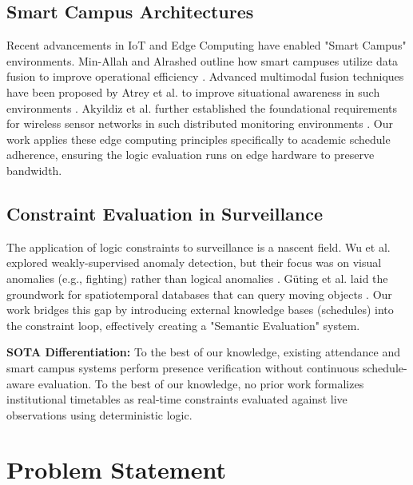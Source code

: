 \documentclass[conference]{IEEEtran}
\begin{document}
\subsection{Smart Campus Architectures}
Recent advancements in IoT and Edge Computing have enabled "Smart Campus" environments. Min-Allah and Alrashed outline how smart campuses utilize data fusion to improve operational efficiency \cite{b1}. Advanced multimodal fusion techniques have been proposed by Atrey et al. to improve situational awareness in such environments \cite{b6}. Akyildiz et al. further established the foundational requirements for wireless sensor networks in such distributed monitoring environments \cite{b25}. Our work applies these edge computing principles specifically to academic schedule adherence, ensuring the logic evaluation runs on edge hardware to preserve bandwidth.

\subsection{Constraint Evaluation in Surveillance}
The application of logic constraints to surveillance is a nascent field. Wu et al. explored weakly-supervised anomaly detection, but their focus was on visual anomalies (e.g., fighting) rather than logical anomalies \cite{b14}. Güting et al. laid the groundwork for spatiotemporal databases that can query moving objects \cite{b23}. Our work bridges this gap by introducing external knowledge bases (schedules) into the constraint loop, effectively creating a "Semantic Evaluation" system.

\textbf{SOTA Differentiation:} To the best of our knowledge, existing attendance and smart campus systems perform presence verification without continuous schedule-aware evaluation. To the best of our knowledge, no prior work formalizes institutional timetables as real-time constraints evaluated against live observations using deterministic logic.

\section{Problem Statement}
\end{document}
